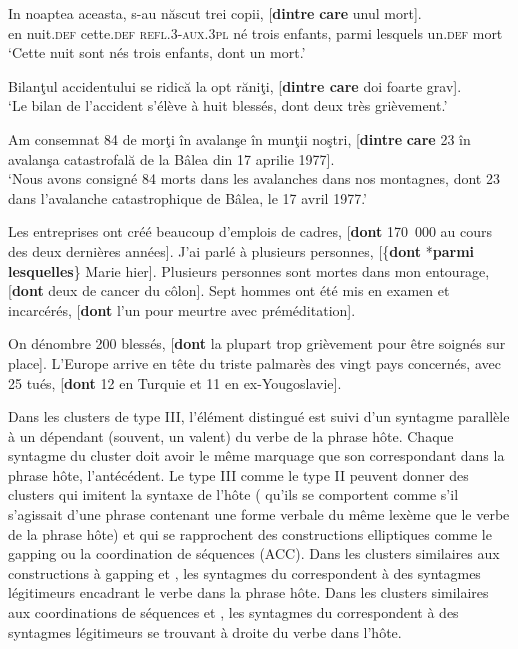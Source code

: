 \ex 
\gll In  noaptea  aceasta,  s-au  născut  trei  copii,  [\textbf{dintre} \textbf{care} unul  mort]. \label{ch3:ex33d}\\
en  nuit.\textsc{def}  cette.\textsc{def}  \textsc{refl.3-aux.3pl}  né  trois  enfants,  parmi  lesquels un.\textsc{def}  mort \\
\glt ‘Cette nuit sont nés trois enfants, dont un mort.’
\z 
\z 


\ea \label{ch3:ex34} 
\ea 
Bilanţul accidentului se ridică la opt răniţi, [\textbf{dintre care} doi foarte grav]. \label{ch3:ex34a}\\
\glt ‘Le bilan de l’accident s’élève à huit blessés, dont deux très grièvement.’

\ex 
Am consemnat 84 de morţi în avalanşe în munţii noştri, [\textbf{dintre} \textbf{care} 23 în avalanşa catastrofală de la Bâlea din 17 aprilie 1977]. \label{ch3:ex34b}\\
\glt ‘Nous avons consigné 84 morts dans les avalanches dans nos montagnes, dont 23 dans l’avalanche catastrophique de Bâlea, le 17 avril 1977.’
\z 
\z 


\ea \label{ch3:ex35}
\ea
Les entreprises ont créé beaucoup d’emplois de cadres, [\textbf{dont} 170~000 au cours des deux dernières années]. \label{ch3:ex35a}
\ex 
J’ai parlé à plusieurs personnes, [\{\textbf{dont} {\textbar} *\textbf{parmi lesquelles}\} Marie hier]. \label{ch3:ex35b}
\ex 
Plusieurs personnes sont mortes dans mon entourage, [\textbf{dont} deux de cancer du côlon]. \label{ch3:ex35c}
\ex 
Sept hommes ont été mis en examen et incarcérés, [\textbf{dont} l’un pour meurtre avec préméditation]. \label{ch3:ex35d}
\z 
\z 


\ea \label{ch3:ex36}
\ea 
On dénombre 200 blessés, [\textbf{dont} la plupart trop grièvement pour être soignés sur place]. \label{ch3:ex36a} 
\ex 
L’Europe arrive en tête du triste palmarès des vingt pays concernés, avec 25 tués, [\textbf{dont} 12 en Turquie et 11 en ex-Yougoslavie]. \label{ch3:ex36b} 
\z 
\z 

Dans les clusters de type III, l’élément distingué est suivi d’un syntagme parallèle à un dépendant (souvent, un valent) du verbe de la phrase hôte. Chaque syntagme du cluster doit avoir le même marquage que son correspondant dans la phrase hôte, {\cad} l’antécédent. Le type III comme le type II peuvent donner des clusters qui imitent la syntaxe de l’hôte ({\cad} qu’ils se comportent comme s’il s’agissait d’une phrase contenant une forme verbale du même lexème que le verbe de la phrase hôte) et qui se rapprochent des constructions elliptiques comme le gapping ou la coordination de séquences (ACC). Dans les clusters similaires aux constructions à gapping  et , les syntagmes du  correspondent à des syntagmes légitimeurs encadrant le verbe dans la phrase hôte. Dans les clusters similaires aux coordinations de séquences  et , les syntagmes du  correspondent à des syntagmes légitimeurs se trouvant à droite du verbe dans l’hôte.


